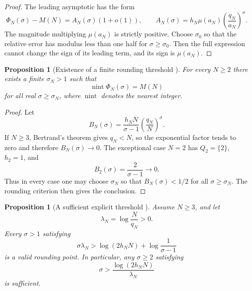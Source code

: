 \documentclass[11pt]{amsart}
\numberwithin{equation}{section}
\theoremstyle{plain}
\newtheorem{proposition}[theorem]{Proposition}
\theoremstyle{definition}
\theoremstyle{remark}
\newcommand{\1}{\mathbf{1}}
\begin{document}
\begin{proof}
The leading asymptotic has the form
\begin{equation}
\Phi_N(\sigma)-M(N)
=
A_N(\sigma)(1+o(1)),
\qquad
A_N(\sigma)
=
h_N\mu(a_N)\left(\frac{q_N}{a_N}\right)^\sigma.
\label{eq:eventual_sign_leading_term}
\end{equation}
The magnitude multiplying \(\mu(a_N)\) is strictly positive.  Choose
\(\sigma_0\) so that the relative error has modulus less than one half for
\(\sigma\geq\sigma_0\).  Then the full expression cannot change the sign
of its leading term, and its sign is \(\mu(a_N)\).
\end{proof}


\begin{proposition}[Existence of a finite rounding threshold {}]
\label{prop:finite_rounding_threshold}
For every $N\geq2$ there exists a finite $\sigma_N>1$ such that
\begin{equation}
\operatorname{nint}\Phi_N(\sigma)=M(N)
\label{eq:eventual_rounding}
\end{equation}
for all real $\sigma\geq\sigma_N$, where $\operatorname{nint}$ denotes the
nearest integer.
\end{proposition}

\begin{proof}
Let
\begin{equation}
B_N(\sigma)
=
\frac{h_NN}{\sigma-1}
\left(\frac{q_N}{N}\right)^\sigma.
\label{eq:rounding_threshold_bound_function}
\end{equation}
If \(N\geq3\), Bertrand's theorem gives \(q_N<N\), so the exponential
factor tends to zero and therefore \(B_N(\sigma)\to0\).  The exceptional
case \(N=2\) has \(Q_2=\{2\}\), \(h_2=1\), and
\begin{equation}
B_2(\sigma)=\frac{2}{\sigma-1}\longrightarrow0.
\label{eq:rounding_threshold_N2}
\end{equation}
Thus in every case one may choose \(\sigma_N\) so that
\(B_N(\sigma)<1/2\) for all \(\sigma\geq\sigma_N\).  The rounding
criterion then gives the conclusion.
\end{proof}


\begin{proposition}[A sufficient explicit threshold {}]
\label{prop:explicit_rounding_threshold}
Assume $N\geq3$, and let
\begin{equation}
\lambda_N=\log\frac{N}{q_N}>0.
\label{eq:lambdaN_definition}
\end{equation}
Every $\sigma>1$ satisfying
\begin{equation}
\sigma\lambda_N
>
\log(2h_NN)+\log\frac1{\sigma-1}
\label{eq:explicit_threshold_implicit}
\end{equation}
is a valid rounding point.  In particular, any $\sigma\geq2$ satisfying
\begin{equation}
\sigma
>
\frac{\log(2h_NN)}{\lambda_N}
\label{eq:explicit_threshold_simple}
\end{equation}
is sufficient.
\end{proposition}
\end{document}
